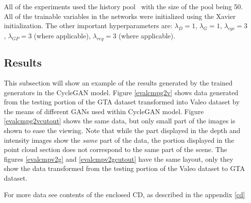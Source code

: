 All of the experiments used the history pool~\cite{historypool} with the size of the pool being 50. All of the trainable variables in the networks were initialized using the Xavier~\cite{xavier} initialization. The other important hyperparameters are: $\lambda_D = 1$, $\lambda_G = 1$, $\lambda_{cyc} = 3$, $\lambda_{GP} = 3$ (where applicable), $\lambda_{reg} = 3$ (where applicable).

\subsection{Results}

This subsection will show an example of the results generated by the trained generators in the CycleGAN model. Figure \ref{evalcmpg2v} shows data generated from the testing portion of the GTA dataset transformed into Valeo dataset by the means of different GANs used within CycleGAN model. Figure \ref{evalcmpg2vcutout} shows the same data, but only small part of the images is shown to ease the viewing. Note that while the part displayed in the depth and intensity images show the {\em same} part of the data, the portion displayed in the point cloud section does not correspond to the same part of the scene. The figures \ref{evalcmpv2g} and \ref{evalcmpv2gcutout} have the same layout, only they show the data transformed from the testing portion of the Valeo dataset to GTA dataset.

For more data see contents of the enclosed CD, as described in the appendix \ref{cd}

